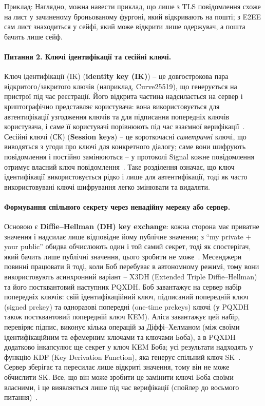 Приклад: Наглядно, можна навести приклад, що лише з TLS повідомлення схоже на лист у зачиненому броньованому фургоні, 
який відкривають на пошті; з E2EE сам лист знаходиться у сейфі, який може відкрити лише одержувач, а пошта бачить 
лише сейф.

\paragraph{Питання 2. Ключі ідентифікації та сесійні ключі.}
Ключ ідентифікації (IK) (\textbf{identity key (IK)}) -- це довгострокова пара відкритого/закритого ключів (наприклад, 
Curve25519), що генерується на пристрої під час реєстрації. Його відкрита частина надсилається на сервер і криптографічно 
представляє користувача: вона використовується для автентифікації узгодження ключів та для підписання попередніх 
ключів користувача, і саме її користувачі порівнюють під час взаємної верифікації~\cite{signal_x3dh}. 
Сесійні ключі (СК) (\textbf{Session keys}) -- це короткочасні \textit{симетричні} ключі, що виводяться з угоди 
про ключі для конкретного діалогу; саме вони шифрують повідомлення і постійно замінюються -- у протоколі Signal 
кожне повідомлення отримує власний ключ повідомлення~\cite{signal_double_ratchet}. Таке розділення означає, що 
ключ ідентифікації використовується рідко і лише для автентифікації, тоді як часто використовувані ключі 
шифрування легко змінювати та видаляти.

\paragraph{Формування спільного секрету через ненадійну мережу або сервер.}
Основою є \textbf{Diffie--Hellman (DH) key exchange}: кожна сторона має приватне значення і надсилає лише відповідне 
йому публічне значення; з \enquote{my private + your public} обидва обчислюють один і той самий секрет, тоді як 
спостерігач, який бачить лише публічні значення, цього зробити не може~\cite{signal_x3dh}. Месенджери повинні 
працювати й тоді, коли Боб перебуває в автономному режимі, тому вони використовують асинхронний варіант -- X3DH 
(Extended Triple Diffie–Hellman) та його постквантовий наступник PQXDH. Боб завантажує на сервер набір попередніх 
ключів: свій ідентифікаційний ключ, підписаний попередній ключ (signed prekey) та одноразові попередні (one-time 
prekeys) ключі (у PQXDH також постквантовий попередній ключ KEM). Аліса завантажує цей набір, перевіряє підпис, 
виконує кілька операцій за Діффі–Хелманом (між своїми ідентифікаційним та ефемерним ключами та ключами Боба), а 
в PQXDH додатково інкапсулює ще секрет у ключ KEM Боба; усі результати надходять у функцію KDF (Key Derivation 
Function), яка генерує спільний ключ SK~\cite{signal_pqxdh}. Сервер зберігає та пересилає лише відкриті значення, 
тому він не може обчислити SK. Все, що він може зробити це замінити ключі Боба своїми власними, і це виявляється 
лише під час верифікації (спойлер до восьмого питання)~\cite{signal_x3dh}.

